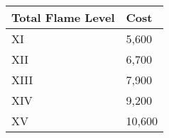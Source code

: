 \begin{minipage}{0.30\textwidth}
    \begin{tabular}{l | l}
        Total Flame Level & Cost\\ \hline
        XI & 5,600\\
        XII & 6,700\\
        XIII & 7,900\\
        XIV & 9,200\\
        XV & 10,600\\
    \end{tabular}
\end{minipage}










